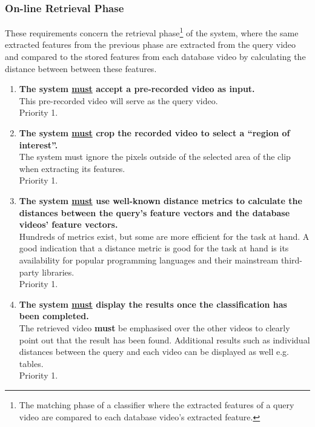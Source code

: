 \subsubsection{On-line Retrieval Phase}

These requirements concern the retrieval phase\footnote{The matching phase of a classifier where the extracted features of a query video are compared to each database video's extracted feature.} of the system, where the same extracted features from the previous phase are extracted from the query video and compared to the stored features from each database video by calculating the distance between between these features.

\begin{enumerate}[label=F\arabic*,resume]

    \item \textbf{The system \underline{must} accept a pre-recorded video as input.}\\
    This pre-recorded video will serve as the query video.\\
    Priority 1.
    
    \item \textbf{The system \underline{must} crop the recorded video to select a ``region of interest''.}\\
    The system must ignore the pixels outside of the selected area of the clip when extracting its features.\\
    Priority 1.
    
    \item \textbf{The system \underline{must} use well-known distance metrics to calculate the distances between the query's feature vectors and the database videos' feature vectors.}\\
    Hundreds of metrics exist, but some are more efficient for the task at hand. A good indication that a distance metric is good for the task at hand is its availability for popular programming languages and their mainstream third-party libraries.\\
    Priority 1.
    
    \item \textbf{The system \underline{must} display the results once the classification has been completed.}\\
    The retrieved video \textbf{must} be emphasised over the other videos to clearly point out that the result has been found. Additional results such as individual distances between the query and each video can be displayed as well e.g. tables.\\
    Priority 1.
    

\end{enumerate}
